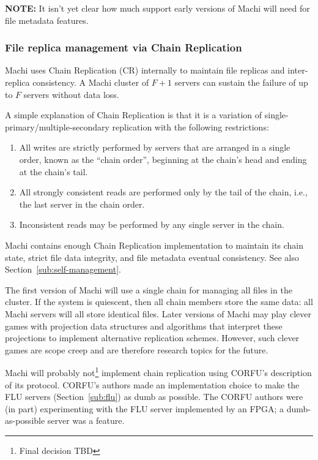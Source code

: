 \documentclass[preprint,10pt]{sigplanconf}
\begin{document}
{\bf NOTE:} It isn't yet clear how much support early versions of
Machi will need for file metadata features.

\subsubsection{File replica management via Chain Replication}
\label{sub:chain-replication}

Machi uses Chain Replication (CR) internally to maintain file
replicas and inter-replica consistency.
A Machi cluster of $F+1$ servers can sustain the failure of up
to $F$ servers without data loss.

A simple explanation of Chain Replication is that it is a variation of
single-primary/multiple-secondary replication with the following
restrictions:

\begin{enumerate}
\item All writes are strictly performed by servers that are arranged
  in a single order, known as the ``chain order'', beginning at the
  chain's head and ending at the chain's tail.
\item All strongly consistent reads are performed only by the tail of
  the chain, i.e., the last server in the chain order.
\item Inconsistent reads may be performed by any single server in the
  chain.
\end{enumerate}

Machi contains enough Chain Replication implementation to maintain its
chain state, strict file data integrity, and file metadata eventual
consistency.  See also Section~\ref{sub:self-management}.

The first version of Machi will use a single chain for managing all
files in the cluster.  If the system is quiescent,
then all chain members store the same data: all
Machi servers will all store identical files.  Later versions of Machi
may play clever games with projection data structures and algorithms
that interpret these projections to implement alternative replication
schemes.  However, such clever games are scope creep and are therefore
research topics for the future.

Machi will probably not\footnote{Final decision TBD} implement chain
replication using CORFU's description of its protocol.  CORFU's
authors made an implementation choice to make the FLU servers
(Section~\ref{sub:flu}) as dumb as possible.  The CORFU authors were
(in part) experimenting with the FLU server implemented by an FPGA; a
dumb-as-possible server was a feature.
\end{document}
